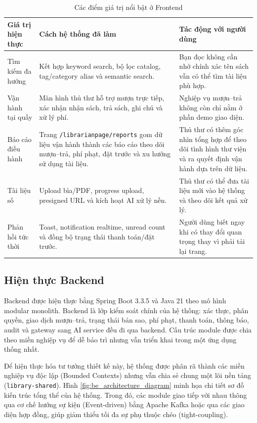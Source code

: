 \begin{table}[H]
\centering
\small
\begin{tabularx}{\textwidth}{|p{3.4cm}|X|p{3.4cm}|}
\hline
\textbf{Giá trị hiện thực} & \textbf{Cách hệ thống đã làm} & \textbf{Tác động với người dùng} \\
\hline
Tìm kiếm đa hướng &
Kết hợp keyword search, bộ lọc catalog, tag/category alias và semantic search. &
Bạn đọc không cần nhớ chính xác tên sách vẫn có thể tìm tài liệu phù hợp. \\
\hline
Vận hành tại quầy &
Màn hình thủ thư hỗ trợ mượn trực tiếp, xác nhận nhận sách, trả sách, ghi chú và xử lý phí. &
Nghiệp vụ mượn--trả không còn chỉ nằm ở phần demo giao diện. \\
\hline
Báo cáo điều hành &
Trang \texttt{/librarianpage/reports} gom dữ liệu vận hành thành các báo cáo
theo dõi mượn--trả, phí phạt, đặt trước và xu hướng sử dụng tài liệu. &
Thủ thư có thêm góc nhìn tổng hợp để theo dõi tình hình thư viện và ra quyết
định vận hành dựa trên dữ liệu. \\
\hline
Tài liệu số &
Upload bìa/PDF, progress upload, presigned URL và kích hoạt AI xử lý nền. &
Thủ thư có thể đưa tài liệu mới vào hệ thống và theo dõi kết quả xử lý. \\
\hline
Phản hồi tức thời &
Toast, notification realtime, unread count và đồng bộ trạng thái thanh toán/đặt trước. &
Người dùng biết ngay khi có thay đổi quan trọng thay vì phải tải lại trang. \\
\hline
\end{tabularx}
\caption{Các điểm giá trị nổi bật ở Frontend}
\label{tab:fe_value_highlights}
\end{table}

\subsection{Hiện thực Backend}

Backend được hiện thực bằng Spring Boot 3.3.5 và Java 21 theo mô hình modular
monolith. Backend là lớp kiểm soát chính của hệ thống: xác thực, phân quyền,
giao dịch mượn--trả, trạng thái bản sao, phí phạt, thanh toán, thông báo, audit
và gateway sang AI service đều đi qua backend. Cấu trúc module được chia theo
miền nghiệp vụ để dễ bảo trì nhưng vẫn triển khai trong một ứng dụng thống nhất.


Để hiện thực hóa tư tưởng thiết kế này, hệ thống được phân rã thành các miền nghiệp vụ độc lập (Bounded Contexts) nhưng vẫn chia sẻ chung một lõi nền tảng (\texttt{library-shared}). Hình \ref{fig:be_architecture_diagram} minh họa chi tiết sơ đồ kiến trúc tổng thể của hệ thống. Trong đó, các module giao tiếp với nhau thông qua cơ chế hướng sự kiện (Event-driven) bằng Apache Kafka hoặc qua các giao diện hợp đồng, giúp giảm thiểu tối đa sự phụ thuộc chéo (tight-coupling).

